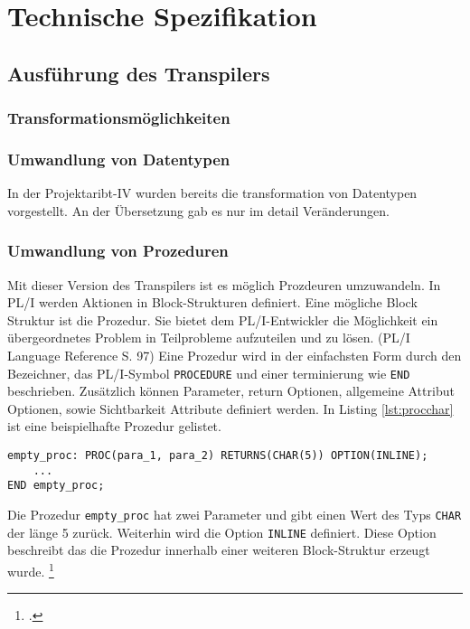 {\section{Technische Spezifikation}
\subsection{Ausführung des Transpilers}
\subsubsection{Transformationsmöglichkeiten}
\subsubsection{Umwandlung von Datentypen}
In der Projektaribt-IV wurden bereits die transformation von Datentypen vorgestellt. An der Übersetzung gab es nur im detail Veränderungen.

\subsubsection{Umwandlung von Prozeduren}

Mit dieser Version des Transpilers ist es möglich Prozdeuren umzuwandeln.
In PL/I werden Aktionen in Block-Strukturen definiert. Eine mögliche Block Struktur ist die Prozedur. Sie bietet dem PL/I-Entwickler die Möglichkeit ein übergeordnetes Problem
in Teilprobleme aufzuteilen und zu lösen. (PL/I Language Reference S. 97)
Eine Prozedur wird in der einfachsten Form durch den Bezeichner, das PL/I-Symbol \verb+PROCEDURE+ und einer terminierung wie \verb+END+
beschrieben.
Zusätzlich können Parameter, return Optionen, allgemeine Attribut Optionen, sowie Sichtbarkeit Attribute definiert werden.
In Listing \ref{lst:procchar} ist eine beispielhafte Prozedur gelistet.

\begin{lstlisting}[language=PL/I, caption=Deklaration einer Prozedur des Typs Char, label={lst:procchar}]
empty_proc: PROC(para_1, para_2) RETURNS(CHAR(5)) OPTION(INLINE);
	...
END empty_proc;
\end{lstlisting}

Die Prozedur \verb+empty_proc+ hat zwei Parameter und gibt einen Wert des Typs \verb+CHAR+ der länge 5 zurück.
Weiterhin wird die Option \verb+INLINE+ definiert. Diese Option beschreibt das die Prozedur innerhalb einer weiteren Block-Struktur erzeugt wurde. \footcite[Vgl. ][]{optionsstmt}

}
